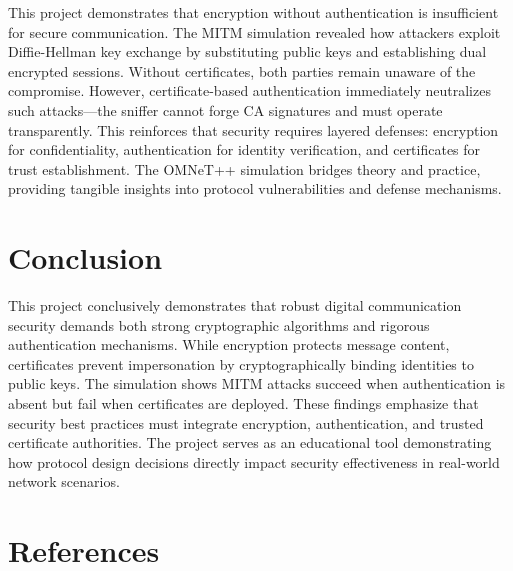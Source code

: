 \documentclass[a4paper,12pt]{extarticle}
\begin{document}
This project demonstrates that encryption without authentication is insufficient for secure communication. The MITM simulation revealed how attackers exploit Diffie-Hellman key exchange by substituting public keys and establishing dual encrypted sessions. Without certificates, both parties remain unaware of the compromise. However, certificate-based authentication immediately neutralizes such attacks—the sniffer cannot forge CA signatures and must operate transparently. This reinforces that security requires layered defenses: encryption for confidentiality, authentication for identity verification, and certificates for trust establishment. The OMNeT++ simulation bridges theory and practice, providing tangible insights into protocol vulnerabilities and defense mechanisms.

\section*{Conclusion}

This project conclusively demonstrates that robust digital communication security demands both strong cryptographic algorithms and rigorous authentication mechanisms. While encryption protects message content, certificates prevent impersonation by cryptographically binding identities to public keys. The simulation shows MITM attacks succeed when authentication is absent but fail when certificates are deployed. These findings emphasize that security best practices must integrate encryption, authentication, and trusted certificate authorities. The project serves as an educational tool demonstrating how protocol design decisions directly impact security effectiveness in real-world network scenarios.








\section[References]{\Huge\textbf{References}}
\vspace{0.5cm}
\end{document}
